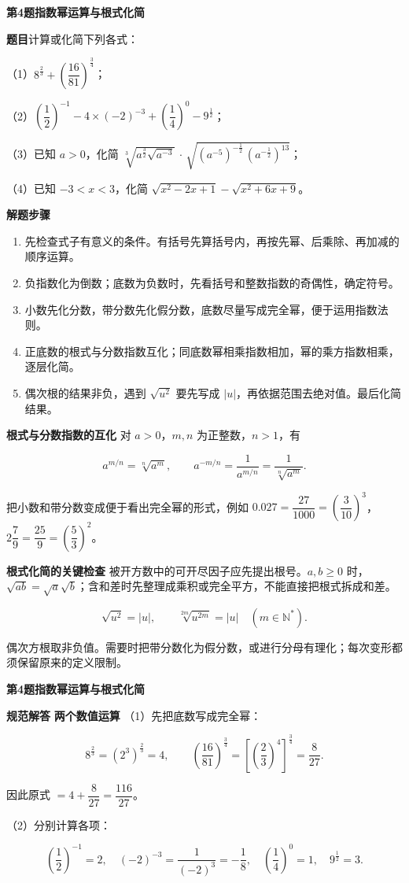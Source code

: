 \documentclass[UTF8,zihao=-4]{ctexart}
\newcommand{\subq}[1]{\par\Needspace{2\baselineskip}（#1）}
\newcommand{\labeltext}[1]{\par\textbf{#1}\quad}
\begin{document}
\clearpage
{\Large\bfseries 第4题\quad 指数幂运算与根式化简}
\labeltext{题目}计算或化简下列各式：
\subq{1}$8^{\frac23}+\left(\dfrac{16}{81}\right)^{\frac34}$；
\subq{2}$\left(\dfrac12\right)^{-1}-4\times(-2)^{-3}+\left(\dfrac14\right)^0-9^{\frac12}$；
\subq{3}已知 $a>0$，化简 $\sqrt[3]{a^{\frac32}\sqrt{a^{-3}}}\,\cdot\,\sqrt{(a^{-5})^{-\frac12}\,(a^{-\frac12})^{13}}$；
\subq{4}已知 $-3<x<3$，化简 $\sqrt{x^2-2x+1}-\sqrt{x^2+6x+9}$。
\labeltext{解题步骤}\begin{enumerate}
\item 先检查式子有意义的条件。有括号先算括号内，再按先幂、后乘除、再加减的顺序运算。
\item 负指数化为倒数；底数为负数时，先看括号和整数指数的奇偶性，确定符号。
\item 小数先化分数，带分数先化假分数，底数尽量写成完全幂，便于运用指数法则。
\item 正底数的根式与分数指数互化；同底数幂相乘指数相加，幂的乘方指数相乘，逐层化简。
\item 偶次根的结果非负，遇到 $\sqrt{u^2}$ 要先写成 $|u|$，再依据范围去绝对值。最后化简结果。
\end{enumerate}
\labeltext{根式与分数指数的互化}
对 $a>0$，$m,n$ 为正整数，$n>1$，有\par
\[a^{m/n}=\sqrt[n]{a^m},\qquad a^{-m/n}=\frac1{a^{m/n}}=\frac1{\sqrt[n]{a^m}}.\]\par
把小数和带分数变成便于看出完全幂的形式，例如 $0.027=\dfrac{27}{1000}=(\dfrac3{10})^3$，$2\dfrac79=\dfrac{25}9=(\dfrac53)^2$。\par
\labeltext{根式化简的关键检查}
被开方数中的可开尽因子应先提出根号。$a,b\ge0$ 时，$\sqrt{ab}=\sqrt a\sqrt b$；含和差时先整理成乘积或完全平方，不能直接把根式拆成和差。\par
\[\sqrt{u^2}=|u|,\qquad \sqrt[2m]{u^{2m}}=|u|\quad(m\in\mathbb N^*).\]\par
偶次方根取非负值。需要时把带分数化为假分数，或进行分母有理化；每次变形都须保留原来的定义限制。\par
\clearpage
{\Large\bfseries 第4题\quad 指数幂运算与根式化简}
\labeltext{规范解答}
\textbf{两个数值运算}\quad
（1）先把底数写成完全幂：\par
\[8^{\frac23}=(2^3)^{\frac23}=4,\qquad \left(\frac{16}{81}\right)^{\frac34}=\left[\left(\frac23\right)^4\right]^{\frac34}=\frac8{27}.\]\par
因此原式 $=4+\dfrac8{27}=\boxed{\dfrac{116}{27}}$。\par
（2）分别计算各项：\par
\[\left(\frac12\right)^{-1}=2,\quad(-2)^{-3}=\frac1{(-2)^3}=-\frac18,\quad\left(\frac14\right)^0=1,\quad9^{\frac12}=3.\]\par
\end{document}
